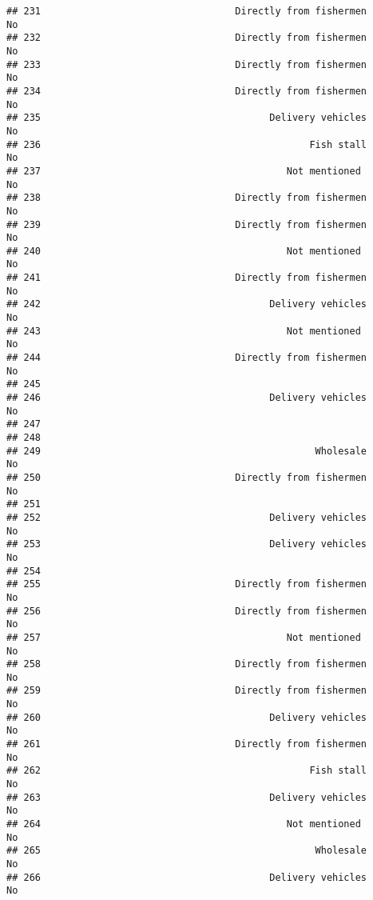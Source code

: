 \documentclass[
]{article}
\begin{document}
\begin{verbatim}
## 231                                  Directly from fishermen        No
## 232                                  Directly from fishermen        No
## 233                                  Directly from fishermen        No
## 234                                  Directly from fishermen        No
## 235                                        Delivery vehicles        No
## 236                                               Fish stall        No
## 237                                           Not mentioned         No
## 238                                  Directly from fishermen        No
## 239                                  Directly from fishermen        No
## 240                                           Not mentioned         No
## 241                                  Directly from fishermen        No
## 242                                        Delivery vehicles        No
## 243                                           Not mentioned         No
## 244                                  Directly from fishermen        No
## 245                                                                   
## 246                                        Delivery vehicles        No
## 247                                                                   
## 248                                                                   
## 249                                                Wholesale        No
## 250                                  Directly from fishermen        No
## 251                                                                   
## 252                                        Delivery vehicles        No
## 253                                        Delivery vehicles        No
## 254                                                                   
## 255                                  Directly from fishermen        No
## 256                                  Directly from fishermen        No
## 257                                           Not mentioned         No
## 258                                  Directly from fishermen        No
## 259                                  Directly from fishermen        No
## 260                                        Delivery vehicles        No
## 261                                  Directly from fishermen        No
## 262                                               Fish stall        No
## 263                                        Delivery vehicles        No
## 264                                           Not mentioned         No
## 265                                                Wholesale        No
## 266                                        Delivery vehicles        No

\end{verbatim}
\end{document}
